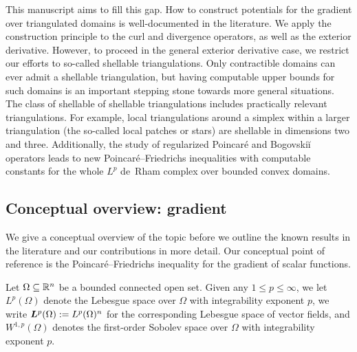 \documentclass[10pt,a4paper]{article}
\begin{document}
This manuscript aims to fill this gap. How to construct potentials for the gradient over triangulated domains is well-documented in the literature. 
We apply the construction principle to the curl and divergence operators, as well as the exterior derivative. 
However, to proceed in the general exterior derivative case, we restrict our efforts to so-called shellable triangulations. 
Only contractible domains can ever admit a shellable triangulation, but having computable upper bounds for such domains is an important stepping stone towards more general situations. 
The class of shellable of shellable triangulations includes practically relevant triangulations. 
For example, local triangulations around a simplex within a larger triangulation (the so-called local patches or stars) are shellable in dimensions two and three. 
Additionally, the study of regularized Poincar\'e and Bogovski\u{i} operators leads to new Poincar\'e--Friedrichs inequalities with computable constants for the whole $L^{p}$ de~Rham complex over bounded convex domains.




\subsection{Conceptual overview: gradient}

We give a conceptual overview of the topic before we outline the known results in the literature and our contributions in more detail. Our conceptual point of reference is the Poincar\'e--Friedrichs inequality for the gradient of scalar functions. 

Let $\Omega \subseteq {\mathbb R}^n$ be a bounded connected open set. Given any $1 \leq p \leq \infty$, we let $L^{p}(\Omega)$ denote the Lebesgue space over $\Omega$ with integrability exponent $p$, we write $\bm{L}^{p}(\Omega) := L^{p}(\Omega)^{n}$ for the corresponding Lebesgue space of vector fields, and $W^{1,p}(\Omega)$ denotes the first-order Sobolev space over $\Omega$ with integrability exponent $p$. 
\end{document}

